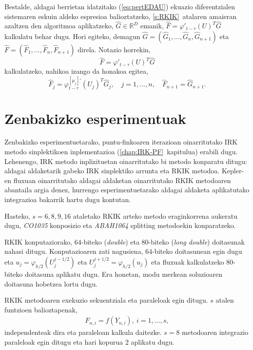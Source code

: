 Bestalde,  aldagai berrietan idatzitako (\ref{eq:pertEDAU}) ekuazio diferentzialen sistemaren eskuin aldeko espresioa balioztatzeko, \ref{s:RKIK}~atalaren amaieran azaltzen den algoritmoa aplikatzeko, $\widehat G \in \mathbb{R}^D$ emanik,  $\widehat F = \varphi'_{t-\tau}(U)^{T} \widehat G$ kalkulatu behar dugu.
Hori egiteko, demagun $\widehat G = (\widehat G_1,\ldots,\widehat G_n,\widehat G_{n+1})$ eta  $\widehat F = (\widehat F_1,\ldots,\widehat F_n,\widehat F_{n+1})$ direla. Notazio horrekin,
\begin{equation*}
\widehat F = \varphi'_{t-\tau}(U)^{T} \widehat G
\end{equation*}
 kalkulatzeko, nahikoa izango da honakoa egitea,
\begin{equation*}
\widehat F_j =  \varphi^{[\mu_{j}]'}_{t-\tau}(U_j)^{T} \widehat G_j, \quad j=1,\ldots,n, \quad \widehat F_{n+1} = \widehat G_{n+1}.
\end{equation*}




\section{Zenbakizko esperimentuak}
\label{s:7espmt}

Zenbakizko esperimentuetarako, puntu-finkoaren iterazioan oinarritutako IRK metodo sinplektikoen inplementazioa (\ref{chap:IRK-PF}~kapitulua) erabili dugu. Lehenengo, IRK metodo inplizituetan oinarritutako  bi metodo konparatu ditugu: aldagai aldaketarik gabeko IRK sinplektiko arrunta eta RKIK metodoa. Kepler-en fluxuan oinarritutako aldagai aldaketan oinarritutako RKIK metodoaren abantaila argia denez, hurrengo esperimentuetarako aldagai aldaketa aplikatutako integrazioa bakarrik hartu dugu kontutan.

Hasteko, $s=6,8,9,16$ ataletako RKIK arteko metodo eraginkorrena aukeratu dugu, \emph{CO1035} konposizio eta \emph{ABAH1064} splitting  metodoekin konparatzeko.

RKIK konputaziorako, $64$-biteko (\emph{double}) eta $80$-biteko (\emph{long double}) doitasunak nahasi ditugu. Konputazioaren zati nagusiena, $64$-biteko doitasunean egin dugu eta $u_{j} = \varphi_{h/2}(U_{j}^{j-1/2})$ eta
$U_j^{j+1/2} = \varphi_{h/2}(u_j)$ eta fluxuak kalkulatzeko $80$-biteko doitasuna aplikatu dugu. Era honetan, modu merkean soluzioaren doitasuna hobetzea lortu dugu.

RKIK metodoaren exekuzio sekuentziala eta paraleloak egin ditugu. $s$ atalen funtzioen balioztapenak,
\begin{align*}
F_{n,i}=f(Y_{n,i}), \ i=1,\dots,s,
\end{align*}
independenteak dira eta paraleloan kalkula daitezke. $s=8$ metodoaren integrazio paraleloak egin ditugu eta hari kopurua $2$ aplikatu dugu.

